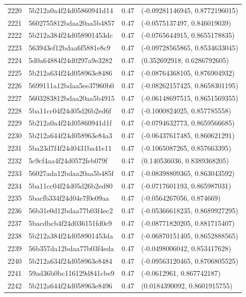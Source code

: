 \begin{table}[ht]
\begin{tabular}{rlrl}
  2220 & 5b212a0a4f24d05860941d14 & 0.47 & (-0.09281146945, 0.8772196015) \\ 
  2221 & 5602755812bdaa20aa5b4857 & 0.47 & (-0.0575137497, 0.846019039) \\ 
  2222 & 5b212a384f24d058901453dc & 0.47 & (-0.0765644915, 0.8655178835) \\ 
  2223 & 563943ef12bdaa6f5881e8c9 & 0.47 & (-0.09728565865, 0.8534633045) \\ 
  2224 & 5d0a64884f24d0297a9e3282 & 0.47 & (0.352692918, 0.6286792605) \\ 
  2225 & 5b212a634f24d058963e8486 & 0.47 & (-0.08764368105, 0.876904932) \\ 
  2226 & 5699111a12bdaa5ee37960b0 & 0.47 & (-0.08262157425, 0.8658301195) \\ 
  2227 & 5603283812bdaa20aa5b4915 & 0.47 & (-0.06148697515, 0.8651569355) \\ 
  2228 & 5ba11cc04f24d05d26b2ed6f & 0.47 & (-0.1000824025, 0.857785558) \\ 
  2229 & 5b212a0a4f24d05860941d1f & 0.47 & (-0.0794632773, 0.8659566685) \\ 
  2230 & 5b212a644f24d058963e84a3 & 0.47 & (-0.06437617485, 0.860621291) \\ 
  2231 & 5ba23d7f4f24d0431ba41e11 & 0.47 & (-0.1065087265, 0.857663395) \\ 
  2232 & 5c9cf4aa4f24d0572feb079f & 0.47 & (0.140536036, 0.8389368205) \\ 
  2233 & 56027ada12bdaa20aa5b485f & 0.47 & (-0.08398809365, 0.863043592) \\ 
  2234 & 5ba11cc04f24d05d26b2ed80 & 0.47 & (-0.0717601193, 0.865987031) \\ 
  2235 & 5bacfb334f24d04e7f0e09aa & 0.47 & (-0.0564267056, 0.874669) \\ 
  2236 & 56b31e0d12bdaa77b03f4ec2 & 0.47 & (-0.05366618235, 0.8689927295) \\ 
  2237 & 5bacdbcb4f24d036151fd0e9 & 0.47 & (-0.08771820205, 0.881715407) \\ 
  2238 & 5b212a384f24d058901453da & 0.47 & (-0.06870151405, 0.8652888565) \\ 
  2239 & 56b357da12bdaa77b03f4eda & 0.47 & (-0.0498006042, 0.853417628) \\ 
  2240 & 5b212a634f24d058963e8484 & 0.47 & (-0.09563120465, 0.8706805525) \\ 
  2241 & 59ad36b0bc116129d841cbe9 & 0.47 & (-0.0612961, 0.867742187) \\ 
  2242 & 5b212a644f24d058963e8496 & 0.47 & (0.0184390092, 0.8601915755) \\ 

\end{tabular}
\end{table}
